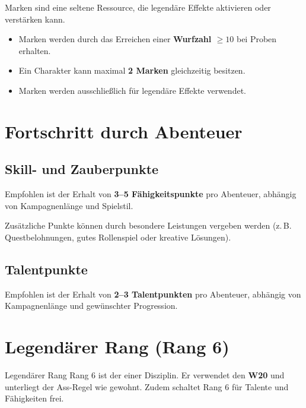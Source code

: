 \begin{rulebox}{Marken}
	 sind eine seltene Ressource, die legendäre Effekte
	aktivieren oder verstärken kann.
\end{rulebox}

\begin{itemize}
	\item Marken werden durch das Erreichen einer \textbf{Wurfzahl $\ge 10$}
	bei Proben erhalten.
	\item Ein Charakter kann maximal \textbf{2 Marken} gleichzeitig besitzen.
	\item Marken werden ausschließlich für legendäre Effekte verwendet.
\end{itemize}


\section{Fortschritt durch Abenteuer}

\subsection*{Skill- und Zauberpunkte}

Empfohlen ist der Erhalt von \textbf{3–5 Fähigkeitspunkte}
pro Abenteuer, abhängig von Kampagnenlänge und Spielstil.

Zusätzliche Punkte können durch besondere Leistungen vergeben werden
(z.\,B. Questbelohnungen, gutes Rollenspiel oder kreative Lösungen).

\subsection*{Talentpunkte}

Empfohlen ist der Erhalt von \textbf{2–3 Talentpunkten} pro Abenteuer,
abhängig von Kampagnenlänge und gewünschter Progression.

\section{Legendärer Rang (Rang 6)}

\begin{rulebox}{Legendärer Rang}
	Rang 6 ist der  einer Disziplin.
	Er verwendet den \textbf{W20} und unterliegt der Ass-Regel wie gewohnt.
	Zudem schaltet Rang 6 für Talente und Fähigkeiten  frei.
\end{rulebox}

